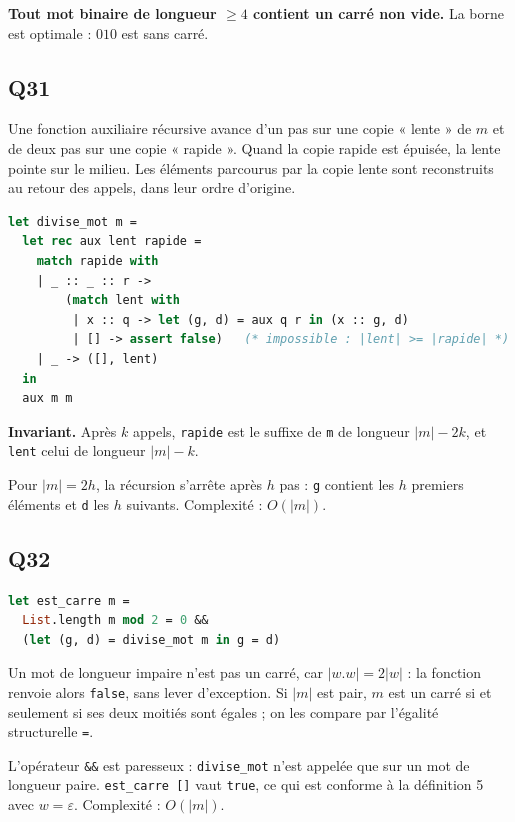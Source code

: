 \documentclass[11pt,a4paper]{article}
\begin{document}
\textbf{Tout mot binaire de longueur \(\ge 4\) contient un carré non vide.} La borne est optimale : \(010\) est sans carré.

\hypertarget{q31}{%
\subsection{Q31}\label{q31}}

Une fonction auxiliaire récursive avance d'un pas sur une copie « lente » de \(m\) et de deux pas sur une copie « rapide ». Quand la copie rapide est épuisée, la lente pointe sur le milieu. Les éléments parcourus par la copie lente sont reconstruits au retour des appels, dans leur ordre d'origine.

\begin{lstlisting}[language=Caml]
let divise_mot m =
  let rec aux lent rapide =
    match rapide with
    | _ :: _ :: r ->
        (match lent with
         | x :: q -> let (g, d) = aux q r in (x :: g, d)
         | [] -> assert false)   (* impossible : |lent| >= |rapide| *)
    | _ -> ([], lent)
  in
  aux m m
\end{lstlisting}

\textbf{Invariant.} Après \(k\) appels, \texttt{rapide} est le suffixe de \texttt{m} de longueur \(|m|-2k\), et \texttt{lent} celui de longueur \(|m|-k\).

Pour \(|m|=2h\), la récursion s'arrête après \(h\) pas : \texttt{g} contient les \(h\) premiers éléments et \texttt{d} les \(h\) suivants. Complexité : \(O(|m|)\).

\hypertarget{q32}{%
\subsection{Q32}\label{q32}}

\begin{lstlisting}[language=Caml]
let est_carre m =
  List.length m mod 2 = 0 &&
  (let (g, d) = divise_mot m in g = d)
\end{lstlisting}

Un mot de longueur impaire n'est pas un carré, car \(|w.w|=2|w|\) : la fonction renvoie alors \texttt{false}, sans lever d'exception. Si \(|m|\) est pair, \(m\) est un carré si et seulement si ses deux moitiés sont égales ; on les compare par l'égalité structurelle \texttt{=}.

L'opérateur \texttt{\&\&} est paresseux : \texttt{divise\_mot} n'est appelée que sur un mot de longueur paire. \texttt{est\_carre\ {[}{]}} vaut \texttt{true}, ce qui est conforme à la définition 5 avec \(w=\varepsilon\). Complexité : \(O(|m|)\).
\end{document}
